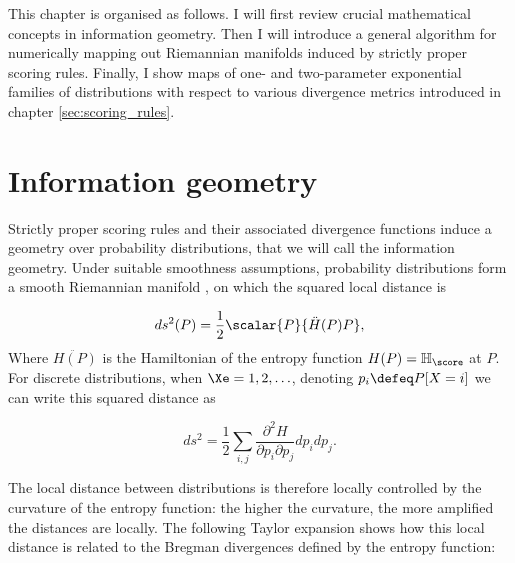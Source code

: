 This chapter is organised as follows. I will first review crucial mathematical concepts in information geometry. Then I will introduce a general algorithm for numerically mapping out Riemannian manifolds induced by strictly proper scoring rules. Finally, I show maps of one- and two-parameter exponential families of distributions with respect to various divergence metrics introduced in chapter \ref{sec:scoring_rules}.

\section{Information geometry}

Strictly proper scoring rules and their associated divergence functions induce a geometry over probability distributions, that we will call the information geometry. Under suitable smoothness assumptions, probability distributions form a smooth Riemannian manifold \citep{Amari,Dawid}, on which the squared local distance is

\begin{equation}
	ds^2(P) = \frac{1}{2} \scalar{P}{\ddot{H}(P)P},
\end{equation}
Where $\ddot{H(P)}$ is the Hamiltonian of the entropy function $H(P) = \mathbb{H}_{\score}$ at $P$. For discrete distributions, when $\Xe={1,2,\ldots}$, denoting $p_i\defeq P[X=i]$ we can write this squared distance as

\begin{equation}
	ds^2 = \frac{1}{2} \sum_{i,j} \frac{\partial^2 H}{\partial p_i\partial p_j} dp_{i} dp_{j}.
\end{equation}

The local distance between distributions is therefore locally controlled by the curvature of the entropy function: the higher the curvature, the more amplified the distances are locally. The following Taylor expansion shows how this local distance is related to the Bregman divergences defined by the entropy function:

